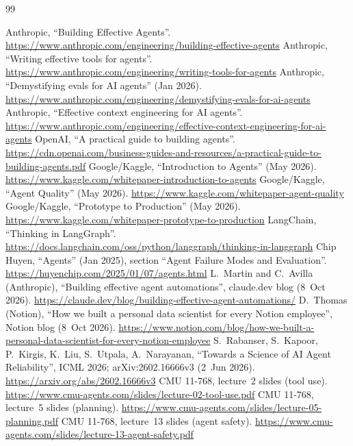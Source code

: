 \documentclass[10pt]{article}
\begin{document}
\begin{thebibliography}{99}
\small

 Anthropic, ``Building Effective Agents''. \url{https://www.anthropic.com/engineering/building-effective-agents}
 Anthropic, ``Writing effective tools for agents''. \url{https://www.anthropic.com/engineering/writing-tools-for-agents}
 Anthropic, ``Demystifying evals for AI agents'' (Jan 2026). \url{https://www.anthropic.com/engineering/demystifying-evals-for-ai-agents}
 Anthropic, ``Effective context engineering for AI agents''. \url{https://www.anthropic.com/engineering/effective-context-engineering-for-ai-agents}
 OpenAI, ``A practical guide to building agents''. \url{https://cdn.openai.com/business-guides-and-resources/a-practical-guide-to-building-agents.pdf}
 Google/Kaggle, ``Introduction to Agents'' (May 2026). \url{https://www.kaggle.com/whitepaper-introduction-to-agents}
 Google/Kaggle, ``Agent Quality'' (May 2026). \url{https://www.kaggle.com/whitepaper-agent-quality}
 Google/Kaggle, ``Prototype to Production'' (May 2026). \url{https://www.kaggle.com/whitepaper-prototype-to-production}
 LangChain, ``Thinking in LangGraph''. \url{https://docs.langchain.com/oss/python/langgraph/thinking-in-langgraph}
 Chip Huyen, ``Agents'' (Jan 2025), section ``Agent Failure Modes and Evaluation''. \url{https://huyenchip.com/2025/01/07/agents.html}
 L.~Martin and C.~Avilla (Anthropic), ``Building effective agent automations'', claude.dev blog (8~Oct 2026). \url{https://claude.dev/blog/building-effective-agent-automations/}
 D.~Thomas (Notion), ``How we built a personal data scientist for every Notion employee'', Notion blog (8~Oct 2026). \url{https://www.notion.com/blog/how-we-built-a-personal-data-scientist-for-every-notion-employee}
 S.~Rabanser, S.~Kapoor, P.~Kirgis, K.~Liu, S.~Utpala, A.~Narayanan, ``Towards a Science of AI Agent Reliability'', ICML 2026; arXiv:2602.16666v3 (2~Jun 2026). \url{https://arxiv.org/abs/2602.16666v3}
 CMU 11-768, lecture~2 slides (tool use). \url{https://www.cmu-agents.com/slides/lecture-02-tool-use.pdf}
 CMU 11-768, lecture~5 slides (planning). \url{https://www.cmu-agents.com/slides/lecture-05-planning.pdf}
 CMU 11-768, lecture~13 slides (agent safety). \url{https://www.cmu-agents.com/slides/lecture-13-agent-safety.pdf}

\end{thebibliography}
\end{document}
